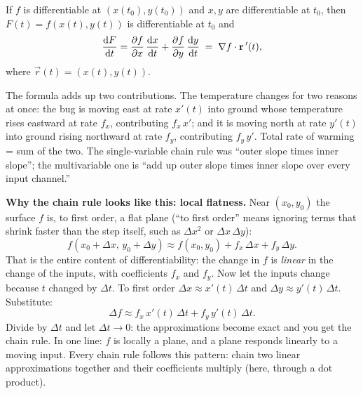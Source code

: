 \begin{theorem}
\label{ch33:thm-chain1}
If $f$ is differentiable at $(x(t_0),y(t_0))$ and $x,y$ are differentiable at
$t_0$, then $F(t)=f(x(t),y(t))$ is differentiable at $t_0$ and
\[
  \frac{\mathrm{d} F}{\mathrm{d} t} = \frac{\partial f}{\partial x}\,\frac{\mathrm{d} x}{\mathrm{d} t} + \frac{\partial f}{\partial y}\,\frac{\mathrm{d} y}{\mathrm{d} t}
  \;=\; \nabla f \cdot \mathbf{r}\,'(t),
\]
where $\vec r(t)=(x(t),y(t))$.
\end{theorem}

\begin{intuitionbox}
The formula adds up two contributions. The temperature changes for
two reasons at once: the bug is moving east at rate $x'(t)$ into ground whose
temperature rises eastward at rate $f_x$, contributing $f_x\,x'$; and it is moving
north at rate $y'(t)$ into ground rising northward at rate $f_y$, contributing
$f_y\,y'$. Total rate of warming = sum of the two. The single-variable chain rule
was ``outer slope times inner slope''; the multivariable one is ``add up outer
slope times inner slope over every input channel.''
\end{intuitionbox}

\begin{whybox}
\textbf{Why the chain rule looks like this: local flatness.} Near $(x_0,y_0)$ the
surface $f$ is, to first order, a flat plane (``to first order'' means ignoring
terms that shrink faster than the step itself, such as $\Delta x^2$ or
$\Delta x\,\Delta y$):
\[
  f(x_0+\Delta x,\, y_0+\Delta y) \approx f(x_0,y_0)
  + f_x\,\Delta x + f_y\,\Delta y.
\]
That is the entire content of differentiability: the change in $f$ is
\emph{linear} in the change of the inputs, with coefficients $f_x$ and $f_y$. Now
let the inputs change because $t$ changed by $\Delta t$. To first order
$\Delta x \approx x'(t)\,\Delta t$ and $\Delta y \approx y'(t)\,\Delta t$.
Substitute:
\[
  \Delta f \approx f_x\,x'(t)\,\Delta t + f_y\,y'(t)\,\Delta t.
\]
Divide by $\Delta t$ and let $\Delta t \to 0$: the approximations become exact and
you get the chain rule. In one line: $f$ is locally a plane, and a plane responds
linearly to a moving input. Every chain rule follows this pattern: chain two linear
approximations together and their coefficients multiply (here, through a dot
product).
\end{whybox}

